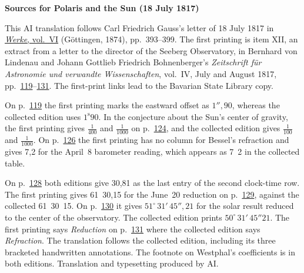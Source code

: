 \clearpage\thispagestyle{empty}
\begin{center}\textbf{Sources for Polaris and the Sun (18 July 1817)}\end{center}
\noindent This AI translation follows Carl Friedrich Gauss’s letter of 18 July 1817 in \href{https://gdz.sub.uni-goettingen.de/id/PPN236007467}{\textit{Werke}, vol.~VI} (Göttingen, 1874), pp.~393--399. The first printing is item XII, an extract from a letter to the director of the Seeberg Observatory, in Bernhard von Lindenau and Johann Gottlieb Friedrich Bohnenberger’s \textit{Zeitschrift für Astronomie und verwandte Wissenschaften}, vol.~IV, July and August 1817, pp.~\href{https://api.digitale-sammlungen.de/iiif/image/v2/bsb10061006_00119/full/1600,/0/default.jpg}{119}--\href{https://api.digitale-sammlungen.de/iiif/image/v2/bsb10061006_00131/full/1600,/0/default.jpg}{131}. The first-print links lead to the Bavarian State Library copy.
\par\smallskip\noindent On p.~\href{https://api.digitale-sammlungen.de/iiif/image/v2/bsb10061006_00119/full/1600,/0/default.jpg}{119} the first printing marks the eastward offset as $1''{,}90$, whereas the collected edition uses $1^{\mathrm s}90$. In the conjecture about the Sun’s center of gravity, the first printing gives $\frac{1}{400}$ and $\frac{1}{1000}$ on p.~\href{https://api.digitale-sammlungen.de/iiif/image/v2/bsb10061006_00124/full/1600,/0/default.jpg}{124}, and the collected edition gives $\frac{1}{100}$ and $\frac{1}{1000}$. On p.~\href{https://api.digitale-sammlungen.de/iiif/image/v2/bsb10061006_00126/full/1600,/0/default.jpg}{126} the first printing has no column for Bessel’s refraction and gives 7,2 for the April~8 barometer reading, which appears as 7~2 in the collected table.
\par\smallskip\noindent On p.~\href{https://api.digitale-sammlungen.de/iiif/image/v2/bsb10061006_00128/full/1600,/0/default.jpg}{128} both editions give 30,81 as the last entry of the second clock-time row. The first printing gives 61~30,15 for the June~20 reduction on p.~\href{https://api.digitale-sammlungen.de/iiif/image/v2/bsb10061006_00129/full/1600,/0/default.jpg}{129}, against the collected 61~30~15. On p.~\href{https://api.digitale-sammlungen.de/iiif/image/v2/bsb10061006_00130/full/1600,/0/default.jpg}{130} it gives $51^\circ\,31'\,45''{,}21$ for the solar result reduced to the center of the observatory. The collected edition prints $50^\circ\,31'\,45''21$. The first printing says \textit{Reduction} on p.~\href{https://api.digitale-sammlungen.de/iiif/image/v2/bsb10061006_00131/full/1600,/0/default.jpg}{131} where the collected edition says \textit{Refraction}. The translation follows the collected edition, including its three bracketed handwritten annotations. The footnote on Westphal’s coefficients is in both editions. Translation and typesetting produced by AI.
\clearpage
